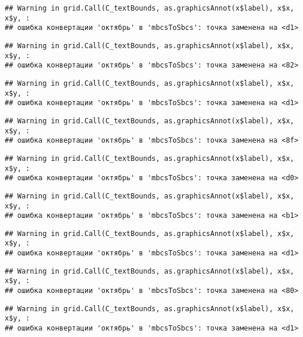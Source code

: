 \documentclass[
]{article}
\begin{document}
\begin{verbatim}
## Warning in grid.Call(C_textBounds, as.graphicsAnnot(x$label), x$x, x$y, :
## ошибка конвертации 'октябрь' в 'mbcsToSbcs': точка заменена на <d1>
\end{verbatim}

\begin{verbatim}
## Warning in grid.Call(C_textBounds, as.graphicsAnnot(x$label), x$x, x$y, :
## ошибка конвертации 'октябрь' в 'mbcsToSbcs': точка заменена на <82>
\end{verbatim}

\begin{verbatim}
## Warning in grid.Call(C_textBounds, as.graphicsAnnot(x$label), x$x, x$y, :
## ошибка конвертации 'октябрь' в 'mbcsToSbcs': точка заменена на <d1>
\end{verbatim}

\begin{verbatim}
## Warning in grid.Call(C_textBounds, as.graphicsAnnot(x$label), x$x, x$y, :
## ошибка конвертации 'октябрь' в 'mbcsToSbcs': точка заменена на <8f>
\end{verbatim}

\begin{verbatim}
## Warning in grid.Call(C_textBounds, as.graphicsAnnot(x$label), x$x, x$y, :
## ошибка конвертации 'октябрь' в 'mbcsToSbcs': точка заменена на <d0>
\end{verbatim}

\begin{verbatim}
## Warning in grid.Call(C_textBounds, as.graphicsAnnot(x$label), x$x, x$y, :
## ошибка конвертации 'октябрь' в 'mbcsToSbcs': точка заменена на <b1>
\end{verbatim}

\begin{verbatim}
## Warning in grid.Call(C_textBounds, as.graphicsAnnot(x$label), x$x, x$y, :
## ошибка конвертации 'октябрь' в 'mbcsToSbcs': точка заменена на <d1>
\end{verbatim}

\begin{verbatim}
## Warning in grid.Call(C_textBounds, as.graphicsAnnot(x$label), x$x, x$y, :
## ошибка конвертации 'октябрь' в 'mbcsToSbcs': точка заменена на <80>
\end{verbatim}

\begin{verbatim}
## Warning in grid.Call(C_textBounds, as.graphicsAnnot(x$label), x$x, x$y, :
## ошибка конвертации 'октябрь' в 'mbcsToSbcs': точка заменена на <d1>
\end{verbatim}
\end{document}
